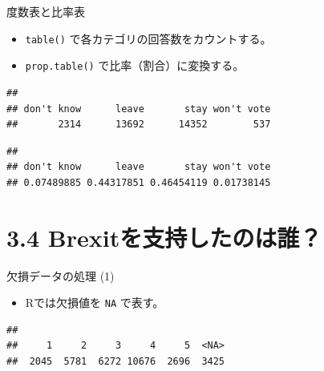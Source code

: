 \documentclass[
  ignorenonframetext,
]{beamer}
\newenvironment{Shaded}{\begin{snugshade}}{\end{snugshade}}
\newcommand{\AttributeTok}[1]{\textcolor[rgb]{0.77,0.63,0.00}{#1}}
\newcommand{\CommentTok}[1]{\textcolor[rgb]{0.56,0.35,0.01}{\textit{#1}}}
\newcommand{\ConstantTok}[1]{\textcolor[rgb]{0.00,0.00,0.00}{#1}}
\newcommand{\FunctionTok}[1]{\textcolor[rgb]{0.00,0.00,0.00}{#1}}
\newcommand{\NormalTok}[1]{#1}
\newcommand{\SpecialCharTok}[1]{\textcolor[rgb]{0.00,0.00,0.00}{#1}}
\providecommand{\tightlist}{%
  \setlength{\itemsep}{0pt}\setlength{\parskip}{0pt}}
\begin{document}
\begin{frame}[fragile]{度数表と比率表}
\protect\hypertarget{ux5ea6ux6570ux8868ux3068ux6bd4ux7387ux8868}{}
\begin{itemize}
\tightlist
\item
  \texttt{table()} で各カテゴリの回答数をカウントする。
\item
  \texttt{prop.table()} で比率（割合）に変換する。
\end{itemize}

\begin{Shaded}
\end{Shaded}

\begin{verbatim}
## 
## don't know      leave       stay won't vote 
##       2314      13692      14352        537
\end{verbatim}

\begin{Shaded}
\end{Shaded}

\begin{verbatim}
## 
## don't know      leave       stay won't vote 
## 0.07489885 0.44317851 0.46454119 0.01738145
\end{verbatim}
\end{frame}

\hypertarget{brexitux3092ux652fux6301ux3057ux305fux306eux306fux8ab0}{%
\section{3.4
Brexitを支持したのは誰？}\label{brexitux3092ux652fux6301ux3057ux305fux306eux306fux8ab0}}

\begin{frame}[fragile]{欠損データの処理 (1)}
\protect\hypertarget{ux6b20ux640dux30c7ux30fcux30bfux306eux51e6ux7406-1}{}
\begin{itemize}
\tightlist
\item
  Rでは欠損値を \texttt{NA} で表す。
\end{itemize}

\begin{Shaded}
\end{Shaded}

\begin{verbatim}
## 
##     1     2     3     4     5  <NA> 
##  2045  5781  6272 10676  2696  3425
\end{verbatim}
\end{frame}
\end{document}
